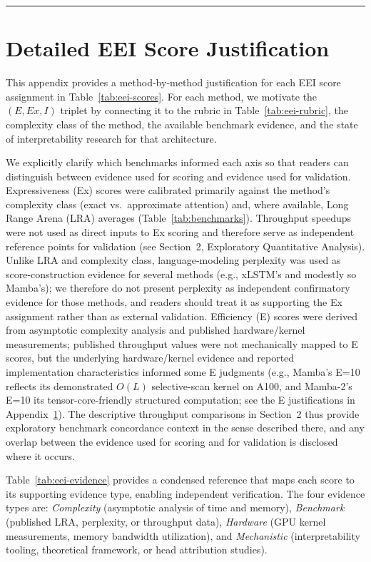 \documentclass[10pt,twocolumn]{article}
\begin{document}
\begin{center}\rule{0.5\linewidth}{0.5pt}\end{center}

\appendix
\section{Detailed EEI Score Justification}\label{app:eei-justification}

This appendix provides a method-by-method justification for each EEI score assignment in Table~\ref{tab:eei-scores}. For each method, we motivate the $(E, \mathit{Ex}, I)$ triplet by connecting it to the rubric in Table~\ref{tab:eei-rubric}, the complexity class of the method, the available benchmark evidence, and the state of interpretability research for that architecture.

We explicitly clarify which benchmarks informed each axis so that readers can distinguish between evidence used for scoring and evidence used for validation. Expressiveness (Ex) scores were calibrated primarily against the method's complexity class (exact vs.\ approximate attention) and, where available, Long Range Arena (LRA) averages (Table~\ref{tab:benchmarks}). Throughput speedups were not used as direct inputs to Ex scoring and therefore serve as independent reference points for validation (see Section~2, Exploratory Quantitative Analysis). Unlike LRA and complexity class, language-modeling perplexity was used as score-construction evidence for several methods (e.g., xLSTM's and modestly so Mamba's); we therefore do not present perplexity as independent confirmatory evidence for those methods, and readers should treat it as supporting the Ex assignment rather than as external validation. Efficiency (E) scores were derived from asymptotic complexity analysis and published hardware/kernel measurements; published throughput values were not mechanically mapped to E scores, but the underlying hardware/kernel evidence and reported implementation characteristics informed some E judgments (e.g., Mamba's E=10 reflects its demonstrated $O(L)$ selective-scan kernel on A100, and Mamba-2's E=10 its tensor-core-friendly structured computation; see the E justifications in Appendix~\ref{app:eei-justification}). The descriptive throughput comparisons in Section~2 thus provide exploratory benchmark concordance context in the sense described there, and any overlap between the evidence used for scoring and for validation is disclosed where it occurs.

Table~\ref{tab:eei-evidence} provides a condensed reference that maps each score to its supporting evidence type, enabling independent verification. The four evidence types are: \textit{Complexity} (asymptotic analysis of time and memory), \textit{Benchmark} (published LRA, perplexity, or throughput data), \textit{Hardware} (GPU kernel measurements, memory bandwidth utilization), and \textit{Mechanistic} (interpretability tooling, theoretical framework, or head attribution studies).
\end{document}
